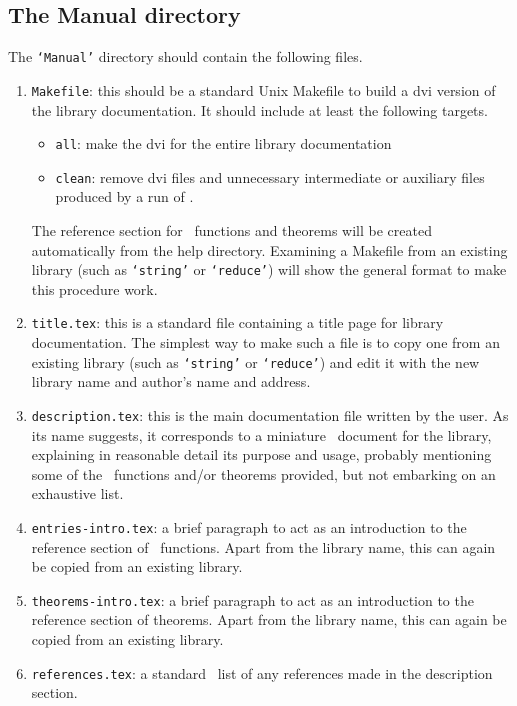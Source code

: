 \subsection{The Manual directory}

The {\tt `Manual'} directory should contain the following files.

\begin{enumerate}

\item{\tt Makefile}: this should be a standard Unix Makefile to build a dvi
version of the library documentation. It should include at least the following
targets.

\begin{itemize}
\item{\tt all}: make the dvi for the entire library documentation
\item{\tt clean}: remove dvi files and unnecessary intermediate or auxiliary
files produced by a run of \latex.
\end{itemize}

The reference section for \ML\ functions and theorems will be created
automatically from the help directory. Examining a Makefile from an existing
library (such as {\tt `string'} or {\tt `reduce'}) will show the general format
to make this procedure work.

\item{\tt title.tex}: this is a standard file containing a title page for
library documentation. The simplest way to make such a file is to copy one from
an existing library (such as {\tt `string'} or {\tt `reduce'}) and edit it with
the new library name and author's name and address.

\item{\tt description.tex}: this is the main documentation file written by the
user. As its name suggests, it corresponds to a miniature \DESCRIPTION\
document for the library, explaining in reasonable detail its purpose and
usage, probably mentioning some of the \ML\ functions and/or theorems provided,
but not embarking on an exhaustive list.

\item{\tt entries-intro.tex}: a brief paragraph to act as an introduction to
the reference section of \ML\ functions. Apart from the library name, this can
again be copied from an existing library.

\item{\tt theorems-intro.tex}: a brief paragraph to act as an introduction to
the reference section of theorems. Apart from the library name, this can again
be copied from an existing library.

\item{\tt references.tex}: a standard \latex\ list of any references made in the
description section.

\end{enumerate}



